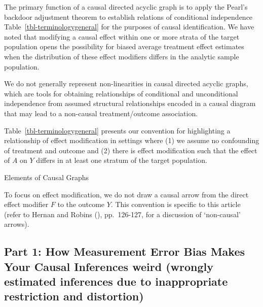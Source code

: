 \documentclass[
  single column]{article}
\begin{document}
The primary function of a causal directed acyclic graph is to apply the
Pearl's backdoor adjustment theorem to establish relations of
conditional independence Table~\ref{tbl-terminologygeneral} for the
purposes of causal identification. We have noted that modifying a causal
effect within one or more strata of the target population opens the
possibility for biased average treatment effect estimates when the
distribution of these effect modifiers differs in the analytic sample
population.

We do not generally represent non-linearities in causal directed acyclic
graphs, which are tools for obtaining relationships of conditional and
unconditional independence from assumed structural relationships encoded
in a causal diagram that may lead to a non-causal treatment/outcome
association.

Table~\ref{tbl-terminologygeneral} presents our convention for
highlighting a relationship of effect modification in settings where (1)
we assume no confounding of treatment and outcome and (2) there is
effect modification such that the effect of \(A\) on \(Y\) differs in at
least one stratum of the target population.

\begin{table}

\caption{\label{tbl-terminologygeneral}Elements of Causal Graphs}

\centering{

\terminologyeffectmodification

}

\end{table}%

To focus on effect modification, we do not draw a causal arrow from the
direct effect modifier \(F\) to the outcome \(Y\). This convention is
specific to this article (refer to Hernan and Robins
(), pp.~126-127, for a discussion
of `non-causal' arrows).

\subsection{\texorpdfstring{Part 1: How Measurement Error Bias Makes
Your Causal Inferences \textbf{weird} (\textbf{w}rongly
\textbf{e}stimated inferences due to \textbf{i}nappropriate
\textbf{r}estriction and
\textbf{d}istortion)}{Part 1: How Measurement Error Bias Makes Your Causal Inferences weird (wrongly estimated inferences due to inappropriate restriction and distortion)}}\label{id-sec-1}
\end{document}
